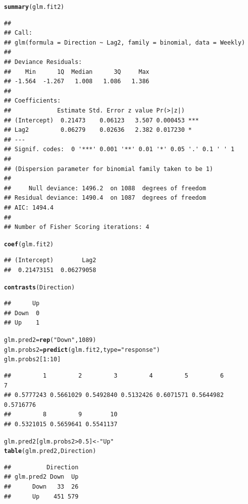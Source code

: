 \documentclass{article}\usepackage[]{graphicx}\usepackage[]{color}
\makeatletter
\newcommand{\hlnum}[1]{\textcolor[rgb]{0.686,0.059,0.569}{#1}}%
\newcommand{\hlstr}[1]{\textcolor[rgb]{0.192,0.494,0.8}{#1}}%
\newcommand{\hlopt}[1]{\textcolor[rgb]{0,0,0}{#1}}%
\newcommand{\hlstd}[1]{\textcolor[rgb]{0.345,0.345,0.345}{#1}}%
\newcommand{\hlkwb}[1]{\textcolor[rgb]{0.69,0.353,0.396}{#1}}%
\newcommand{\hlkwc}[1]{\textcolor[rgb]{0.333,0.667,0.333}{#1}}%
\newcommand{\hlkwd}[1]{\textcolor[rgb]{0.737,0.353,0.396}{\textbf{#1}}}%
\newenvironment{kframe}{%
 \def\at@end@of@kframe{}%
 \ifinner\ifhmode%
  \def\at@end@of@kframe{\end{minipage}}%
  \begin{minipage}{\columnwidth}%
 \fi\fi%
 \def\FrameCommand##1{\hskip\@totalleftmargin \hskip-\fboxsep
 \colorbox{shadecolor}{##1}\hskip-\fboxsep
     \hskip-\linewidth \hskip-\@totalleftmargin \hskip\columnwidth}%
 \MakeFramed {\advance\hsize-\width
   \@totalleftmargin\z@ \linewidth\hsize
   \@setminipage}}%
 {\par\unskip\endMakeFramed%
 \at@end@of@kframe}
\newenvironment{knitrout}{}{} %
\makeatother
\begin{document}
\begin{enumerate}[(a)]
\begin{knitrout}
\begin{kframe}
{\ttfamily\noindent\bfseries\color{errorcolor}{\#\# Error in eval(expr, envir, enclos): object 'mpg01' not found}}\begin{alltt}
\hlkwd{summary}\hlstd{(glm.fit2)}
\end{alltt}
\begin{verbatim}
## 
## Call:
## glm(formula = Direction ~ Lag2, family = binomial, data = Weekly)
## 
## Deviance Residuals: 
##    Min      1Q  Median      3Q     Max  
## -1.564  -1.267   1.008   1.086   1.386  
## 
## Coefficients:
##             Estimate Std. Error z value Pr(>|z|)    
## (Intercept)  0.21473    0.06123   3.507 0.000453 ***
## Lag2         0.06279    0.02636   2.382 0.017230 *  
## ---
## Signif. codes:  0 '***' 0.001 '**' 0.01 '*' 0.05 '.' 0.1 ' ' 1
## 
## (Dispersion parameter for binomial family taken to be 1)
## 
##     Null deviance: 1496.2  on 1088  degrees of freedom
## Residual deviance: 1490.4  on 1087  degrees of freedom
## AIC: 1494.4
## 
## Number of Fisher Scoring iterations: 4
\end{verbatim}
\begin{alltt}
\hlkwd{coef}\hlstd{(glm.fit2)}
\end{alltt}
\begin{verbatim}
## (Intercept)        Lag2 
##  0.21473151  0.06279058
\end{verbatim}
\begin{alltt}
\hlkwd{contrasts}\hlstd{(Direction)}
\end{alltt}
\begin{verbatim}
##      Up
## Down  0
## Up    1
\end{verbatim}
\begin{alltt}
\hlstd{glm.pred2}\hlkwb{=}\hlkwd{rep}\hlstd{(}\hlstr{"Down"}\hlstd{,} \hlnum{1089}\hlstd{)}
\hlstd{glm.probs2}\hlkwb{=}\hlkwd{predict}\hlstd{(glm.fit2,}\hlkwc{type}\hlstd{=}\hlstr{"response"}\hlstd{)}
\hlstd{glm.probs2[}\hlnum{1}\hlopt{:}\hlnum{10}\hlstd{]}
\end{alltt}
\begin{verbatim}
##         1         2         3         4         5         6         7 
## 0.5777243 0.5661029 0.5492840 0.5132426 0.6071571 0.5644982 0.5716776 
##         8         9        10 
## 0.5321015 0.5659641 0.5541137
\end{verbatim}
\begin{alltt}
\hlstd{glm.pred2[glm.probs2}\hlopt{>}\hlnum{0.5}\hlstd{]}\hlkwb{<-}\hlstr{"Up"}
\hlkwd{table}\hlstd{(glm.pred2,Direction)}
\end{alltt}
\begin{verbatim}
##          Direction
## glm.pred2 Down  Up
##      Down   33  26
##      Up    451 579
\end{verbatim}
\end{kframe}
\end{knitrout}
\end{enumerate}
\end{document}
